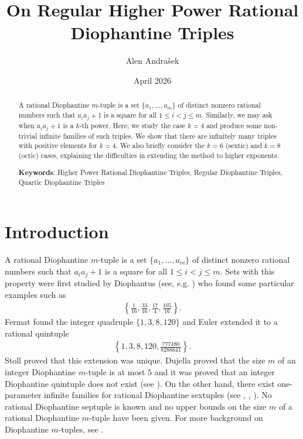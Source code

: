 \documentclass{amsart}
\title{On Regular Higher Power Rational Diophantine Triples}
\author{Alen Andrašek}
\date{April 2026}
\begin{document}
\begin{abstract}
    A rational Diophantine $m$-tuple is a set $\{a_1,\ldots,a_m\}$ of distinct nonzero rational numbers such that $a_i a_j+1$ is a square for all $1\leq i < j\leq m$. Simi\-larly, we may ask when $a_ia_j+1$ is a $k$-th power. Here, we study the case $k=4$ and produce some non-trivial infinite families of such triples. We show that there are infinitely many triples with positive elements for $k=4$. We also briefly consider the $k=6$ (sextic) and $k=8$ (octic) cases, explaining the difficulties in extending the method to higher exponents.

    \smallskip
    \noindent \textbf{Keywords}: Higher Power Rational Diophantine Triples, Regular Diophantine Triples, Quartic Diophantine Triples
\end{abstract}

\maketitle

\section{Introduction}
A rational Diophantine $m$-tuple is a set $\{a_1,\ldots,a_m\}$ of distinct nonzero rational numbers such that $a_i a_j+1$ is a square for all $1\leq i < j\leq m$. Sets with this property were first studied by Diophantus (see, e.g. \cite{diophantusOriginal}) who found some particular examples such as 
\begin{align*}
    \left\{\frac{1}{16}, \frac{33}{16}, \frac{17}{4}, \frac{105}{16}\right\}.
\end{align*} Fermat found the integer quadruple $\{1,3,8,120\}$ and Euler extended it to a rational quintuple 
\begin{align*}
    \left\{1,3,8,120, \frac{777480}{8288641}\right\}.
\end{align*}
Stoll \cite{Stoll_2019} proved that this extension was unique. Dujella \cite{dujella2004there} proved that the size $m$ of an integer Diophantine $m$-tuple is at most $5$ and it was proved that an integer Diophantine quintuple does not exist (see \cite{he2018diophantinequintuple}). On the other hand, there exist one-parameter infinite families for rational Diophantine sextuples (see \cite{dujella2024diophantine}, \cite{dujella2017more}, \cite{dujella2017there}). No rational Diophantine septuple is known and no upper bounds on the size $m$ of a rational Diophantine $m$-tuple have been given. For more background on Diophantine $m$-tuples, see \cite{dujella2024diophantine}.
\end{document}
